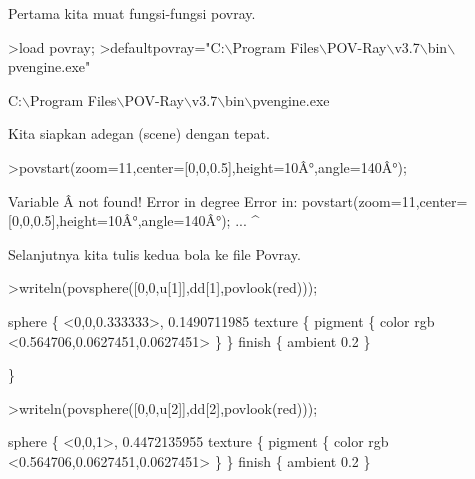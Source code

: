 \documentclass[a4paper,10pt]{article}
\begin{document}
\begin{eulernotebook}
\begin{eulercomment}
\begin{eulercomment}
\begin{eulercomment}
\begin{eulercomment}
\begin{eulercomment}
\begin{eulercomment}
\begin{eulercomment}
\begin{eulercomment}
\begin{eulercomment}
\begin{eulercomment}
\begin{eulercomment}
\begin{eulercomment}
\begin{eulercomment}
\begin{eulercomment}
\begin{eulercomment}
\begin{eulercomment}
\begin{eulercomment}
Pertama kita muat fungsi-fungsi povray.
\end{eulercomment}
\begin{eulerprompt}
>load povray;
>defaultpovray="C:\(\backslash\)Program Files\(\backslash\)POV-Ray\(\backslash\)v3.7\(\backslash\)bin\(\backslash\)pvengine.exe"
\end{eulerprompt}
\begin{euleroutput}
  C:\(\backslash\)Program Files\(\backslash\)POV-Ray\(\backslash\)v3.7\(\backslash\)bin\(\backslash\)pvengine.exe
\end{euleroutput}
\begin{eulercomment}
Kita siapkan adegan (scene) dengan tepat.
\end{eulercomment}
\begin{eulerprompt}
>povstart(zoom=11,center=[0,0,0.5],height=10Â°,angle=140Â°);
\end{eulerprompt}
\begin{euleroutput}
  Variable Â not found!
  Error in degree
  Error in:
  povstart(zoom=11,center=[0,0,0.5],height=10Â°,angle=140Â°); ...
                                               ^
\end{euleroutput}
\begin{eulercomment}
Selanjutnya kita tulis kedua bola ke file Povray.
\end{eulercomment}
\begin{eulerprompt}
>writeln(povsphere([0,0,u[1]],dd[1],povlook(red)));
\end{eulerprompt}
\begin{euleroutput}
  sphere \{ <0,0,0.333333>, 0.1490711985 texture \{ pigment \{ color rgb <0.564706,0.0627451,0.0627451> \}  \} 
   finish \{ ambient 0.2 \} 
  
  \}
\end{euleroutput}
\begin{eulerprompt}
>writeln(povsphere([0,0,u[2]],dd[2],povlook(red)));
\end{eulerprompt}
\begin{euleroutput}
  sphere \{ <0,0,1>, 0.4472135955 texture \{ pigment \{ color rgb <0.564706,0.0627451,0.0627451> \}  \} 
   finish \{ ambient 0.2 \} 
  

\end{euleroutput}
\end{eulercomment}
\end{eulercomment}
\end{eulercomment}
\end{eulercomment}
\end{eulercomment}
\end{eulercomment}
\end{eulercomment}
\end{eulercomment}
\end{eulercomment}
\end{eulercomment}
\end{eulercomment}
\end{eulercomment}
\end{eulercomment}
\end{eulercomment}
\end{eulercomment}
\end{eulercomment}
\end{eulernotebook}
\end{document}
